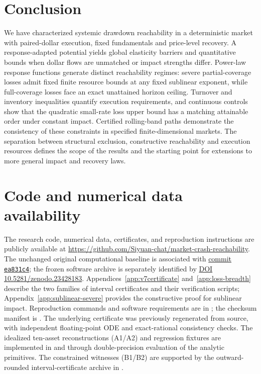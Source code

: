 \documentclass[review,hidelinks,onefignum,onetabnum]{siamonline250211}
\begin{document}
\section{Conclusion}\label{sec:conclusion}
We have characterized systemic drawdown reachability in a deterministic
market with paired-dollar execution, fixed fundamentals and price-level
recovery. A response-adapted potential yields global elasticity barriers
and quantitative bounds when dollar flows are unmatched or impact
strengths differ. Power-law response functions generate distinct
reachability regimes: severe partial-coverage losses admit fixed
finite resource bounds at any fixed sublinear exponent, while
full-coverage losses face an exact unattained horizon ceiling.
Turnover and inventory inequalities quantify execution requirements,
and continuous controls show that the quadratic small-rate loss
upper bound has a matching attainable order under constant impact.
Certified rolling-band paths demonstrate the consistency of these
constraints in specified finite-dimensional markets.
The separation between structural exclusion, constructive reachability
and execution resources defines the scope of the results and the
starting point for extensions to more general impact and recovery laws.

\section*{Code and numerical data availability}
The research code, numerical data, certificates, and reproduction instructions are publicly available at \url{https://github.com/Siyuan-chat/market-crash-reachability}. The unchanged original computational baseline is associated with \href{https://github.com/Siyuan-chat/market-crash-reachability/tree/ea831c44f5b77b7039dd6644f6f0a791bb74d176}{commit \texttt{ea831c4}}; the frozen software archive is separately identified by \href{https://doi.org/10.5281/zenodo.23428183}{DOI 10.5281/zenodo.23428183}. Appendices~\ref{app:v7certificate} and~\ref{app:loss-breadth}
describe the two families of interval certificates and their
verification scripts; Appendix~\ref{app:sublinear-severe}
provides the constructive proof for sublinear impact. Reproduction commands and software requirements are in ; the checksum manifest is . The underlying certificate was previously regenerated from source, with independent floating-point ODE and exact-rational consistency checks.
The idealized ten-asset reconstructions (A1/A2) and regression
fixtures are implemented in
 and
through double-precision evaluation of the analytic primitives.
The constrained witnesses (B1/B2) are supported by the
outward-rounded interval-certificate archive in
.
\end{document}
